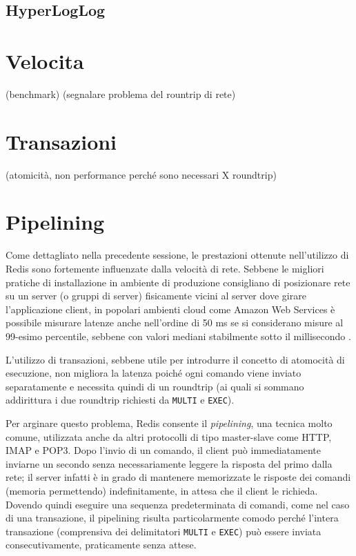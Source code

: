 \subsection{HyperLogLog}

\section{Velocita}

(benchmark)
(segnalare problema del rountrip di rete)


\section{Transazioni}

(atomicità, non performance perché sono necessari X roundtrip)


\section{Pipelining}

Come dettagliato nella precedente sessione, le prestazioni ottenute nell'utilizzo di Redis sono
fortemente influenzate dalla velocità di rete. Sebbene le migliori pratiche di installazione in
ambiente di produzione consigliano di posizionare rete su un server (o gruppi di server) fisicamente
vicini al server dove girare l'applicazione client, in popolari ambienti cloud come Amazon Web
Services è possibile misurare latenze anche nell'ordine di 50 ms se si considerano misure al
99-esimo percentile, sebbene con valori mediani stabilmente sotto il millisecondo
\cite{aws-latency}.

L'utilizzo di transazioni, sebbene utile per introdurre il concetto di atomocità di esecuzione,
non migliora la latenza poiché ogni comando viene inviato separatamente e necessita quindi di un 
roundtrip (ai quali si sommano addirittura i due roundtrip richiesti da \verb|MULTI| e \verb|EXEC|).

Per arginare questo problema, Redis consente il \emph{pipelining}, una tecnica molto comune, 
utilizzata anche da altri protocolli di tipo master-slave come HTTP, IMAP e POP3. Dopo l'invio 
di un comando, il client può immediatamente inviarne un secondo senza necessariamente leggere
la risposta del primo dalla rete; il server infatti è in grado di mantenere memorizzate le risposte
dei comandi (memoria permettendo) indefinitamente, in attesa che il client le richieda. Dovendo
quindi eseguire una sequenza predeterminata di comandi, come nel caso di una transazione, il
pipelining risulta particolarmente comodo perché l'intera transazione (comprensiva dei delimitatori
\verb|MULTI| e \verb|EXEC|) può essere inviata consecutivamente, praticamente senza attese.

